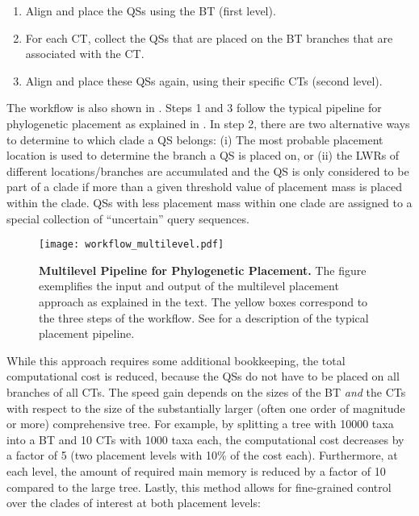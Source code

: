 \begin{enumerate}
    \item Align and place the \acp{QS} using the \ac{BT} (first level).
    \item For each \ac{CT}, collect the \acp{QS} that are placed on the \ac{BT} branches that are associated with the \ac{CT}.
    \item Align and place these \acp{QS} again, using their specific \acp{CT} (second level).
\end{enumerate}

The workflow is also shown in .
Steps 1 and 3 follow the typical pipeline for phylogenetic placement
as explained in .
In step 2, there are two alternative ways to determine to which clade a \ac{QS} belongs:
(i) The most probable placement location is used to determine the branch a \ac{QS} is placed on,
or (ii) the LWRs of different locations/branches are accumulated and
the \ac{QS} is only considered to be part of a clade
if more than a given threshold value of placement mass is placed within the clade.
\acp{QS} with less placement mass within one clade are assigned to a special collection of ``uncertain'' query sequences.

\begin{figure}[hpbt]
    \centering
    \texttt{[image: workflow\_multilevel.pdf]}
    \caption[Multilevel Pipeline for Phylogenetic Placement]{
        \textbf{Multilevel Pipeline for Phylogenetic Placement.}
        The figure exemplifies the input and output of the multilevel placement approach as explained in the text.
        The yellow boxes correspond to the three steps of the workflow.
        See  for a description of the typical placement pipeline.
    }
    \label{fig:workflow_multilevel}
\end{figure}

While this approach requires some additional bookkeeping,
the total computational cost is reduced,
because the \acp{QS} do not have to be placed on all branches of all \acp{CT}.
The speed gain depends on the sizes of the \ac{BT} \emph{and} the \acp{CT}
with respect to the size of the substantially larger (often one order of magnitude or more) comprehensive tree.
For example, by splitting a tree with \num{10 000} taxa into a \ac{BT} and \num{10} \acp{CT} with 1000 taxa each,
the computational cost decreases by a factor of 5 (two placement levels with 10\% of the cost each).
Furthermore, at each level,
the amount of required main memory is reduced by a factor of \num{10} compared to the large tree.
Lastly, this method allows for fine-grained control over the clades of interest at both placement levels:

